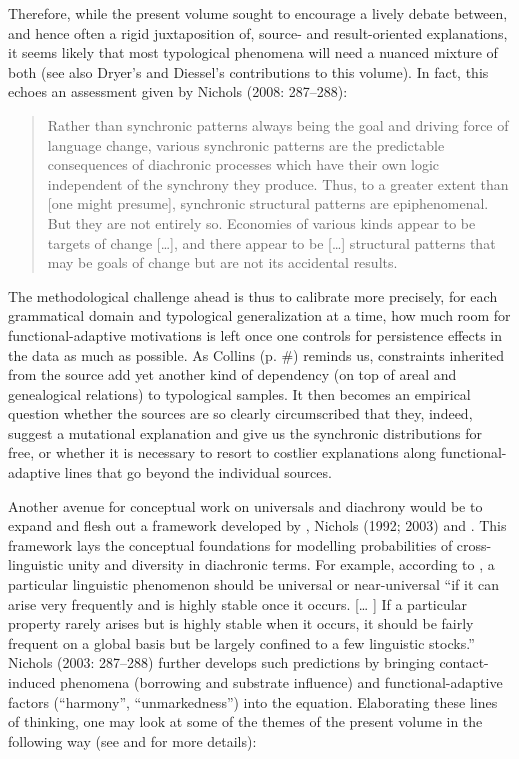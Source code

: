 \documentclass[output=paper]{langsci/langscibook}
\begin{document}
Therefore, while the present volume sought to encourage a lively debate between, and hence often a rigid juxtaposition of, source- and result-oriented explanations, it seems likely that most typological phenomena will need a nuanced mixture of both (see also Dryer’s and Diessel’s contributions to this volume). In fact, this echoes an assessment given by Nichols (2008: 287–288):

\begin{quote}
Rather than synchronic patterns always being the goal and driving force of language change, various synchronic patterns are the predictable consequences of diachronic processes which have their own logic independent of the synchrony they produce. Thus, to a greater extent than [one might presume], synchronic structural patterns are epiphenomenal. But they are not entirely so. Economies of various kinds appear to be targets of change […], and there appear to be […] structural patterns that may be goals of change but are not its accidental results.
\end{quote}

The methodological challenge ahead is thus to calibrate more precisely, for each grammatical domain and typological generalization at a time, how much room for functional-adaptive motivations is left once one controls for persistence effects in the data as much as possible. As Collins (p. \#) reminds us, constraints inherited from the source add yet another kind of dependency (on top of areal and genealogical relations) to typological samples. It then becomes an empirical question whether the sources are so clearly circumscribed that they, indeed, suggest a mutational explanation and give us the synchronic distributions for free, or whether it is necessary to resort to costlier explanations along functional-adaptive lines that go beyond the individual sources.

Another avenue for conceptual work on universals and diachrony would be to expand and flesh out a framework developed by \citet{Greenberg1978}, Nichols (1992; 2003) and \citet{Bickel2013}. This framework lays the conceptual foundations for modelling probabilities of cross-linguistic unity and diversity in diachronic terms. For example, according to \citet[76]{Greenberg1978}, a particular linguistic phenomenon should be universal or near-universal “if it can arise very frequently and is highly stable once it occurs. [… ] If a particular property rarely arises but is highly stable when it occurs, it should be fairly frequent on a global basis but be largely confined to a few linguistic stocks.” Nichols (2003: 287–288) further develops such predictions by bringing contact-induced phenomena (borrowing and substrate influence) and functional-adaptive factors (“harmony”, “unmarkedness”) into the equation. Elaborating these lines of thinking, one may look at some of the themes of the present volume in the following way (see \citealt{Grossman2016} and \citealt{GrossmanEtAl2018} for more details):
\end{document}
